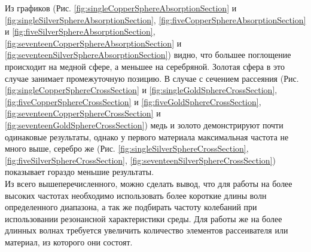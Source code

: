 Из графиков (Рис. \ref{fig:singleCopperSphereAbsorptionSection} и \ref{fig:singleSilverSphereAbsorptionSection}, \ref{fig:fiveCopperSphereAbsorptionSection} и \ref{fig:fiveSilverSphereAbsorptionSection}, \ref{fig:seventeenCopperSphereAbsorptionSection} и \ref{fig:seventeenSilverSphereAbsorptionSection}) видно, что большее поглощение происходит на медной сфере, а меньшее на серебряной. Золотая сфера в это случае занимает промежуточную позицию. В случае с сечением рассеяния (Рис. \ref{fig:singleCopperSphereCrossSection} и \ref{fig:singleGoldSphereCrossSection}, \ref{fig:fiveCopperSphereCrossSection} и \ref{fig:fiveGoldSphereCrossSection}, \ref{fig:seventeenCopperSphereCrossSection} и \ref{fig:seventeenGoldSphereCrossSection}) медь и золото демонстрируют почти одинаковые результаты, однако у первого материала максимальная частота не много выше, серебро же (Рис. \ref{fig:singleSilverSphereCrossSection}, \ref{fig:fiveSilverSphereCrossSection}, \ref{fig:seventeenSilverSphereCrossSection}) показывает гораздо меньшие результаты. \\
Из всего вышеперечисленного, можно сделать вывод, что для работы на более высоких частотах необходимо использовать более короткие длины волн определенного диапазона, а так же подбирать частоту колебаний при использовании резонансной характеристики среды. Для работы же на более длинных волнах требуется увеличить количество элементов рассеивателя или материал, из которого они состоят.

